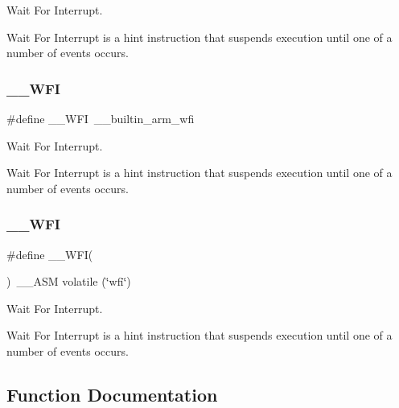 Wait For Interrupt. 

Wait For Interrupt is a hint instruction that suspends execution until one of a number of events occurs. \mbox{\label{group___c_m_s_i_s___core___instruction_interface_gad23bf2b78a9a4524157c9de0d30b7448}} 
\subsubsection{\texorpdfstring{\_\_WFI}{\_\_WFI}\hspace{0.1cm}{\footnotesize\ttfamily [3/4]}}
{\footnotesize\ttfamily \#define \+\_\+\+\_\+\+W\+FI~\+\_\+\+\_\+builtin\+\_\+arm\+\_\+wfi}



Wait For Interrupt. 

Wait For Interrupt is a hint instruction that suspends execution until one of a number of events occurs. \mbox{\label{group___c_m_s_i_s___core___instruction_interface_gab28e2b328c4cf23c917ab18a23194f8e}} 
\subsubsection{\texorpdfstring{\_\_WFI}{\_\_WFI}\hspace{0.1cm}{\footnotesize\ttfamily [4/4]}}
{\footnotesize\ttfamily \#define \+\_\+\+\_\+\+W\+FI(\begin{DoxyParamCaption}{ }\end{DoxyParamCaption})~\+\_\+\+\_\+\+A\+SM volatile (\char`\"{}wfi\char`\"{})}



Wait For Interrupt. 

Wait For Interrupt is a hint instruction that suspends execution until one of a number of events occurs. 

\subsection{Function Documentation}
\mbox{\label{group___c_m_s_i_s___core___instruction_interface_gae84a2733711339c5eefeb0d899506b96}} 
